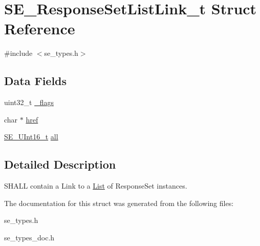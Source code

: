 \hypertarget{structSE__ResponseSetListLink__t}{}\section{S\+E\+\_\+\+Response\+Set\+List\+Link\+\_\+t Struct Reference}
\label{structSE__ResponseSetListLink__t}


{\ttfamily \#include $<$se\+\_\+types.\+h$>$}

\subsection*{Data Fields}
\begin{DoxyCompactItemize}
\item 
uint32\+\_\+t \hyperlink{group__ResponseSetListLink_gac0a7f9313464899bf0f7ce52ebccb127}{\+\_\+flags}
\item 
char $\ast$ \hyperlink{group__ResponseSetListLink_ga03c5ac2bc319d804b19972bf181a7ffb}{href}
\item 
\hyperlink{group__UInt16_gac68d541f189538bfd30cfaa712d20d29}{S\+E\+\_\+\+U\+Int16\+\_\+t} \hyperlink{group__ResponseSetListLink_ga7803a9cad6f20a2c92bd6fb19237adb9}{all}
\end{DoxyCompactItemize}


\subsection{Detailed Description}
S\+H\+A\+LL contain a Link to a \hyperlink{structList}{List} of Response\+Set instances. 

The documentation for this struct was generated from the following files\+:\begin{DoxyCompactItemize}
\item 
se\+\_\+types.\+h\item 
se\+\_\+types\+\_\+doc.\+h\end{DoxyCompactItemize}
